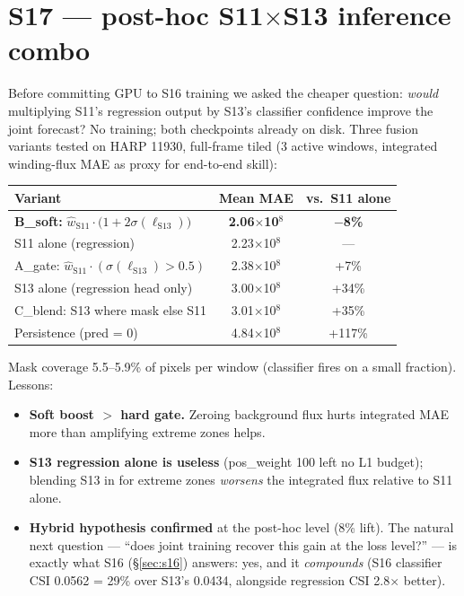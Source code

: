 \section{S17 --- post-hoc S11\(\times\)S13 inference combo}

Before committing GPU to S16 training we asked the cheaper
question: \emph{would} multiplying S11's regression output by S13's
classifier confidence improve the joint forecast? No training; both
checkpoints already on disk. Three fusion variants tested on HARP
11930, full-frame tiled (3 active windows, integrated winding-flux
MAE as proxy for end-to-end skill):

\begin{center}\small
\begin{tabular}{l c c}
\toprule
Variant & Mean MAE & vs.\ S11 alone \\
\midrule
\rowcolor{tabhdr}
\textbf{B\_soft:} \(\hat w_{\text{S11}} \cdot \bigl(1 + 2\sigma(\ell_{\text{S13}})\bigr)\)
& \textbf{2.06\(\times\)10\(^8\)} & \textcolor{wingreen}{\textbf{\(-\)8\%}}\\
S11 alone (regression)             & 2.23\(\times\)10\(^8\) & --- \\
A\_gate: \(\hat w_{\text{S11}} \cdot (\sigma(\ell_{\text{S13}}) > 0.5)\)
& 2.38\(\times\)10\(^8\) & \textcolor{winred}{+7\%} \\
S13 alone (regression head only) & 3.00\(\times\)10\(^8\) & +34\% \\
C\_blend: S13 where mask else S11 & 3.01\(\times\)10\(^8\) & +35\% \\
Persistence (pred = 0)             & 4.84\(\times\)10\(^8\) & +117\% \\
\bottomrule
\end{tabular}
\end{center}

Mask coverage 5.5--5.9\% of pixels per window (classifier fires on a
small fraction). Lessons:
\begin{itemize}[leftmargin=14pt,itemsep=1pt,topsep=2pt]
\item \textbf{Soft boost \(>\) hard gate.} Zeroing background flux
      hurts integrated MAE more than amplifying extreme zones helps.
\item \textbf{S13 regression alone is useless} (pos\_weight 100 left
      no L1 budget); blending S13 in for extreme zones \emph{worsens}
      the integrated flux relative to S11 alone.
\item \textbf{Hybrid hypothesis confirmed} at the post-hoc level
      (8\% lift). The natural next question --- ``does joint
      training recover this gain at the loss level?'' --- is exactly
      what S16 (\S\ref{sec:s16}) answers: yes, and it
      \emph{compounds} (S16 classifier CSI 0.0562 = 29\% over S13's
      0.0434, alongside regression CSI 2.8\(\times\) better).
\end{itemize}
